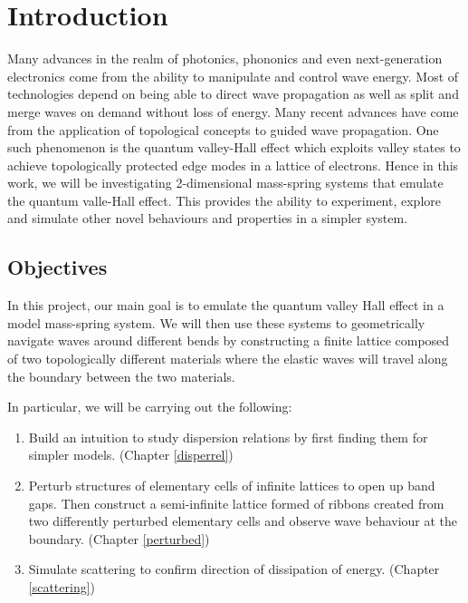 \chapter{Introduction}
Many advances in the realm of photonics, phononics and even next-generation
electronics come from the ability to manipulate and control wave
energy.\cite{gravwaves,emcloak,diremi,antennasol,THz,absorbing,toposplit,negrefraclens}
Most of technologies depend on being able to direct wave propagation as well as
split and merge waves on demand without loss of energy. Many recent advances
have come from the application of topological concepts to guided wave
propagation.\cite{singlevalley,qshe,valleyhall,2dtopophoto} One such phenomenon
is the quantum valley-Hall effect which exploits valley states to achieve
topologically protected edge modes in a lattice of electrons. Hence in this
work, we will be investigating 2-dimensional mass-spring systems that emulate
the quantum valle-Hall effect. This provides the ability to experiment, explore
and simulate other novel behaviours and properties in a simpler system.

\section{Objectives}
In this project, our main goal is to emulate the quantum valley Hall
effect\cite{mos2, valleyhall} in a model mass-spring system. We will then use
these systems to geometrically navigate waves around different bends by
constructing a finite lattice composed of two topologically different materials
where the elastic waves will travel along the boundary between the two
materials.

In particular, we will be carrying out the following:

\begin{enumerate}
\item Build an intuition to study dispersion relations by first finding them
      for simpler models. (Chapter \ref{disperrel})
\item Perturb structures of elementary cells of infinite lattices to open up
      band gaps. Then construct a semi-infinite lattice formed of ribbons
      created from two differently perturbed elementary cells and observe wave
      behaviour at the boundary. (Chapter \ref{perturbed})
\item Simulate scattering to confirm direction of dissipation of energy.
      (Chapter \ref{scattering})
\end{enumerate}

